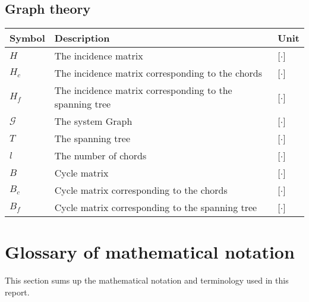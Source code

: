 \subsection*{Graph theory}

\begin{tabular}{l l l} 
	\textbf{Symbol}		&	\textbf{Description}										& \textbf{Unit}	\\\hline
	$H$					&	The incidence matrix									    & [$\cdot$]\\
	$H_c$				&	The incidence matrix corresponding to the chords		    & [$\cdot$]\\
	$H_f$				&	The incidence matrix corresponding to the spanning tree		& [$\cdot$]\\
	$\mathcal{G}$		&	The system Graph											& [$\cdot$]\\
	$T$					&	The spanning tree											& [$\cdot$]\\
	$l$					&	The number of chords										& [$\cdot$]\\
	$B$					&	Cycle matrix 												& [$\cdot$]\\
	$B_c$				&	Cycle matrix corresponding to the chords				    & [$\cdot$]\\
	$B_f$				&	Cycle matrix corresponding to the spanning tree				& [$\cdot$]\\
\end{tabular}	

\newpage
\section*{Glossary of mathematical notation}

This section sums up the mathematical notation and terminology used in this report.

